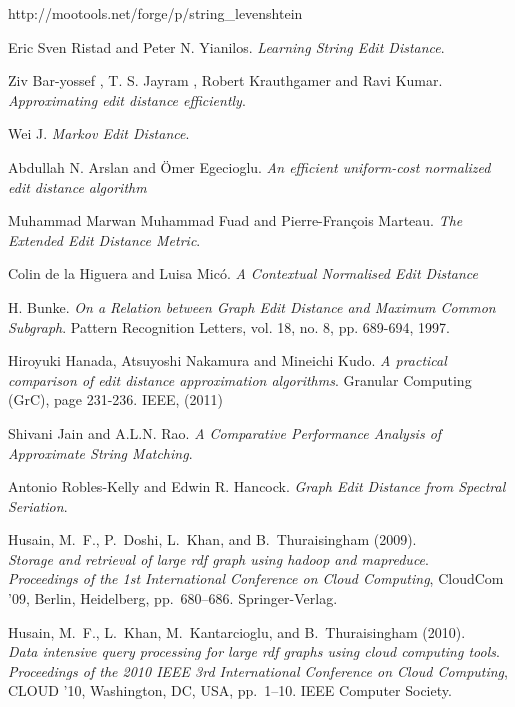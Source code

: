 \documentclass[conference]{IEEEtran}
\begin{document}
\begin{thebibliography}{1}
\bibitem{}
http://mootools.net/forge/p/string\_levenshtein

Eric Sven Ristad and Peter N. Yianilos. \textit{Learning String Edit Distance}.

Ziv Bar-yossef , T. S. Jayram , Robert Krauthgamer and Ravi Kumar. \textit{Approximating edit distance efficiently}.

Wei J. \textit{Markov Edit Distance}.

Abdullah N. Arslan and \"{O}mer Egecioglu. \textit{An efficient uniform-cost normalized edit distance algorithm}

Muhammad Marwan Muhammad Fuad and Pierre-Fran\c{c}ois Marteau. \textit{The Extended Edit Distance Metric}.

Colin de la Higuera and Luisa Mic\'{o}. \textit{A Contextual Normalised Edit Distance}

H. Bunke. \textit{On a Relation between Graph Edit Distance and Maximum Common Subgraph}. Pattern Recognition Letters, vol. 18, no. 8, pp. 689-694, 1997.

Hiroyuki Hanada, Atsuyoshi Nakamura and Mineichi Kudo. \textit{A practical comparison of edit distance approximation algorithms}. Granular Computing (GrC), page 231-236. IEEE, (2011)

Shivani Jain and A.L.N. Rao. \textit{A Comparative Performance Analysis of Approximate String Matching}.

Antonio Robles-Kelly and Edwin R. Hancock. \textit{Graph Edit Distance from Spectral Seriation}.

Husain, M.~F., P.~Doshi, L.~Khan, and B.~Thuraisingham (2009). \\
\textit{Storage and retrieval of large rdf graph using hadoop and mapreduce}. \\
\textit{Proceedings of the 1st International Conference on Cloud Computing}, CloudCom '09, Berlin, Heidelberg, pp.\  680--686.  Springer-Verlag.

Husain, M.~F., L.~Khan, M.~Kantarcioglu, and B.~Thuraisingham (2010). \\
\textit{Data intensive query processing for large rdf graphs using cloud computing tools}. \\
\textit{Proceedings of the 2010 IEEE 3rd International Conference on Cloud Computing},  CLOUD '10, Washington, DC, USA, pp.\  1--10. IEEE Computer Society.


\end{thebibliography}
\end{document}
